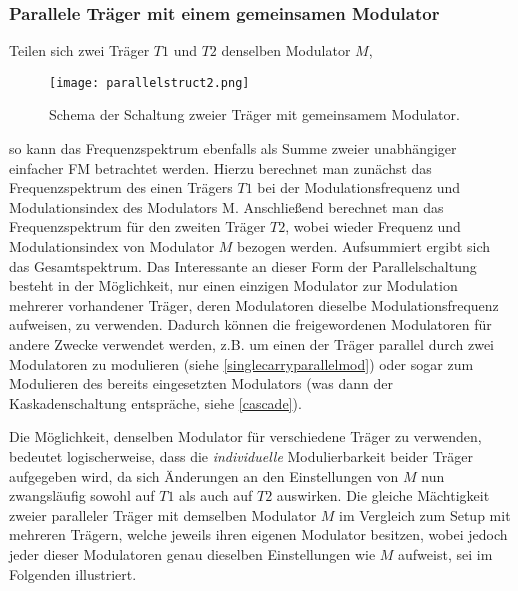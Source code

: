 \subsubsection{Parallele Träger mit einem gemeinsamen Modulator}

Teilen sich zwei Träger $T1$ und $T2$ denselben Modulator $M$,
\FloatBarrier
\begin{figure} [ht]
\centering
  \texttt{[image: parallelstruct2.png]}
\caption{Schema der Schaltung zweier Träger mit gemeinsamem Modulator. }
\end{figure}
\FloatBarrier 
so kann das Frequenzspektrum ebenfalls als Summe zweier unabhängiger einfacher FM betrachtet werden. Hierzu berechnet man zunächst das Frequenzspektrum des einen Trägers $T1$ bei der Modulationsfrequenz und Modulationsindex des Modulators M. Anschließend berechnet man das Frequenzspektrum für den zweiten Träger $T2$, wobei wieder Frequenz und Modulationsindex von Modulator $M$ bezogen werden. Aufsummiert ergibt sich das Gesamtspektrum. Das Interessante an dieser Form der Parallelschaltung besteht in der Möglichkeit, nur einen einzigen Modulator zur Modulation mehrerer vorhandener Träger, deren Modulatoren dieselbe Modulationsfrequenz aufweisen, zu verwenden. Dadurch können die freigewordenen Modulatoren für andere Zwecke verwendet werden, z.B. um einen der Träger parallel durch zwei Modulatoren zu modulieren (siehe \ref{singlecarryparallelmod}) oder sogar zum Modulieren des bereits eingesetzten Modulators (was dann der Kaskadenschaltung entspräche, siehe \ref{cascade}).  

Die Möglichkeit, denselben Modulator für verschiedene Träger zu verwenden, bedeutet logischerweise, dass die \textit{individuelle} Modulierbarkeit beider Träger aufgegeben wird, da sich Änderungen an den Einstellungen von $M$ nun zwangsläufig sowohl auf $T1$ als auch auf $T2$ auswirken. Die gleiche Mächtigkeit zweier paralleler Träger mit demselben Modulator $M$ im Vergleich zum Setup mit mehreren Trägern, welche jeweils ihren eigenen Modulator besitzen, wobei jedoch jeder dieser Modulatoren genau dieselben Einstellungen wie $M$ aufweist, sei im Folgenden illustriert. 

